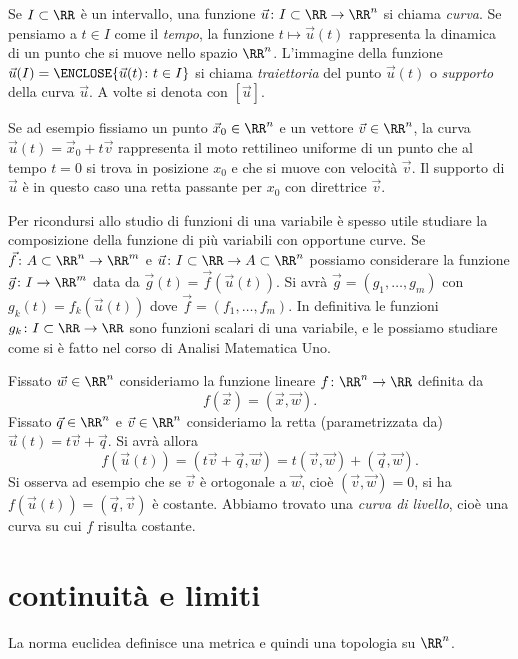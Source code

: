 Se $I\subset \RR$ è un intervallo, 
una funzione $\vec u\colon I\subset \RR \to \RR^n$ si chiama 
\emph{curva}. 
Se pensiamo a $t\in I$ come il \emph{tempo}, la funzione 
$t\mapsto \vec u(t)$ rappresenta la dinamica di un punto 
che si muove nello spazio $\RR^n$.
L'immagine della funzione $\vec u(I) = \ENCLOSE{\vec u(t)\colon t\in I}$
si chiama \emph{traiettoria} del punto $\vec u(t)$ o \emph{supporto}
della curva $\vec u$.
A volte si denota con $[\vec u]$.

Se ad esempio fissiamo un punto $\vec x_0\in \RR^n$ 
e un vettore $\vec v\in \RR^n$, la curva $\vec u(t) = \vec x_0 + t \vec v$
rappresenta il moto rettilineo uniforme di un punto che al tempo $t=0$ 
si trova in posizione $x_0$ e che si muove con velocità $\vec v$.
Il supporto di $\vec u$ è in questo caso una retta passante per $x_0$ 
con direttrice $\vec v$.

Per ricondursi allo studio di funzioni di una variabile 
è spesso utile studiare la composizione della funzione di più variabili 
con opportune curve. 
Se $\vec f\colon A \subset \RR^n\to \RR^m$ e $\vec u\colon I\subset \RR\to A\subset \RR^n$ 
possiamo considerare la funzione $\vec g\colon I \to \RR^m$ 
data da $\vec g(t) = \vec f(\vec u(t))$. 
Si avrà $\vec g = (g_1,\dots, g_m)$ con $g_k(t) = f_k(\vec u(t))$
dove $\vec f = (f_1,\dots, f_m)$. 
In definitiva le funzioni $g_k\colon I\subset \RR \to \RR$ 
sono funzioni scalari di una variabile, e le possiamo studiare 
come si è fatto nel corso di Analisi Matematica Uno.

\begin{example}
Fissato $\vec w \in \RR^n$ consideriamo la funzione 
lineare $f \colon \RR^n \to \RR$ definita da 
\[
   f(\vec x) = (\vec x , \vec w).
\]  
Fissato $\vec q\in \RR^n$ e $\vec v \in \RR^n$ consideriamo la retta (parametrizzata da)
$\vec u(t) = t \vec v + \vec q$.
Si avrà allora 
\[
  f(\vec u(t)) = (t \vec v + \vec q, \vec w) = t (\vec v,\vec w) + (\vec q, \vec w).
\]
Si osserva ad esempio che se $\vec v$ è ortogonale a $\vec w$,
cioè $(\vec v, \vec w)=0$, si ha $f(\vec u(t))= (\vec q, \vec v)$ è costante.
Abbiamo trovato una \emph{curva di livello}, cioè una curva su 
cui $f$ risulta costante.
\end{example}


\section{continuità e limiti}
La norma euclidea definisce una metrica e quindi una topologia 
su $\RR^n$. 

